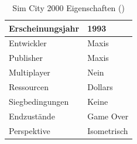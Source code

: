 \begin{table}[]
    \centering
    \caption{Sim City 2000 Eigenschaften (\cite*[]{simcity:igdb})}
    \label{table:simcity}
    \begin{tabular}{|l|l|}
    \hline
    Erscheinungsjahr & 1993                                                                           \\ \hline
    Entwickler       & Maxis                                                                      \\ \hline
    Publisher        & Maxis                                                                      \\ \hline
    Multiplayer      & Nein                                                                           \\ \hline
    Ressourcen       & Dollars \\ \hline
    Siegbedingungen  & Keine                                               \\ \hline
    Endzustände  & Game Over                                               \\ \hline
    Perspektive      & Isometrisch                                                                          \\ \hline
    \end{tabular}
\end{table}

